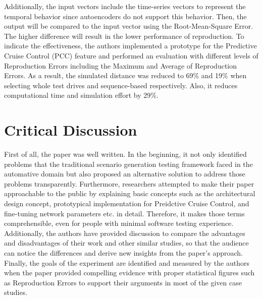 \documentclass[10pt,a4paper]{report}
\begin{document}
%
Additionally, the input vectors include the time-series vectors to represent the temporal behavior since autoencoders do not support this behavior.
%
Then, the output will be compared to the input vector using the Root-Mean-Square Error.
%
The higher difference will result in the lower performance of reproduction.
%
To indicate the effectiveness, the authors implemented a prototype for the Predictive Cruise Control (PCC) feature and performed an evaluation with different levels of Reproduction Errors including the Maximum and Average of Reproduction Errors.
%
As a result, the simulated distance was reduced to 69\% and 19\% when selecting whole test drives and sequence-based respectively. Also, it reduces computational time and simulation effort by 29\%.


\section{Critical Discussion}
First of all, the paper was well written. In the beginning, it not only identified problems that the traditional scenario generation testing framework faced in the automative domain but also proposed an alternative solution to address those problems transparently.
%
Furthermore, researchers attempted to make their paper approachable to the public by explaining basic concepts such as the architectural design concept, prototypical implementation for Preidctive Cruise Control, and fine-tuning network parameters etc. in detail. Therefore, it makes those terms comprehensible, even for people with minimal software testing experience.
%
Additionally, the authors have provided discussion to compare the advantages and disadvantages of their work and other similar studies, so that the audience can notice the differences and derive new insights from the paper's approach.
%
Finally, the goals of the experiment are identified and measured by the authors when the paper provided compelling evidence with proper statistical figures such as Reproduction Errors to support their arguments in most of the given case studies.
%
\end{document}
